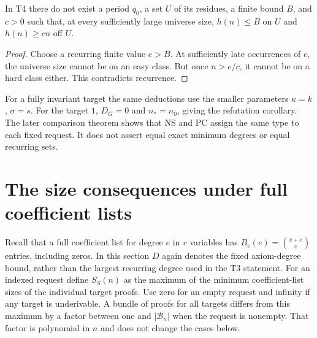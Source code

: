 \begin{proposition}\label{tx:prop:no-periodic-split}
In T4 there do not exist a period $q_0$, a set $U$ of its residues, a
finite bound $B$, and $c>0$ such that, at every sufficiently large universe size,
$h(n)\le B$ on $U$ and $h(n)\ge cn$ off $U$.
\end{proposition}
\begin{proof}
Choose a recurring finite value $e>B$. At sufficiently late occurrences
of $e$, the universe size cannot be on an easy class. But once $n>e/c$, it cannot
be on a hard class either. This contradicts recurrence.
\end{proof}

For a fully invariant target the same deductions use the smaller
parameters $\kappa=k$, $\sigma=s$. For the target $1$, $D_G=0$ and
$n_*=n_0$, giving the refutation corollary. The later comparison theorem
shows that NS and PC assign the same type to each fixed request. It
does not assert equal exact minimum degrees or equal recurring sets.

\section{The size consequences under full coefficient lists}
Recall that a full coefficient list for degree $e$ in $v$ variables
has $B_v(e)=\binom{v+e}{e}$ entries, including zeros. In this section
$D$ again denotes the fixed axiom-degree bound, rather than the largest
recurring degree used in the T3 statement.
For an indexed request define $S_S(n)$ as the maximum of the minimum
coefficient-list sizes of the individual target proofs. Use zero for
an empty request and infinity if any target is underivable. A bundle
of proofs for all targets differs from this maximum by a factor between
one and $|\mathcal B_n|$ when the request is nonempty. That factor is
polynomial in $n$ and does not change the cases below.


